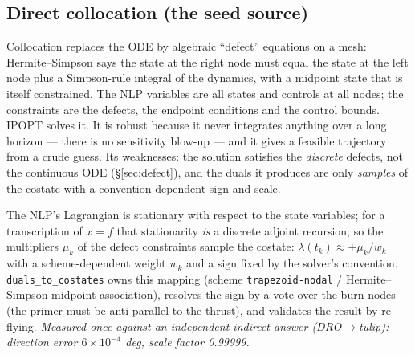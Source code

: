 \documentclass[11pt]{article}
\newcommand{\file}[1]{\texttt{#1}}
\begin{document}
\subsection{Direct collocation (the seed source)}
\begin{intu}
Collocation replaces the ODE by algebraic ``defect'' equations on a mesh:
Hermite--Simpson says the state at the right node must equal the state at the
left node plus a Simpson-rule integral of the dynamics, with a midpoint state
that is itself constrained. The NLP variables are all states and controls at
all nodes; the constraints are the defects, the endpoint conditions and the
control bounds. IPOPT solves it. It is robust because it never integrates
anything over a long horizon --- there is no sensitivity blow-up --- and it
gives a feasible trajectory from a crude guess. Its weaknesses: the solution
satisfies the \emph{discrete} defects, not the continuous ODE (\S\ref{sec:defect}),
and the duals it produces are only \emph{samples} of the costate with a
convention-dependent sign and scale.
\end{intu}
\begin{rig}
The NLP's Lagrangian is stationary with respect to the state variables; for a
transcription of $\dot x=f$ that stationarity \emph{is} a discrete adjoint
recursion, so the multipliers $\mu_k$ of the defect constraints sample the
costate: $\lambda(t_k)\approx \pm\mu_k/w_k$ with a scheme-dependent weight
$w_k$ and a sign fixed by the solver's convention. \file{duals\_to\_costates}
owns this mapping (scheme \texttt{trapezoid-nodal} / Hermite--Simpson
midpoint association), resolves the sign by a vote over the burn nodes
(the primer must be anti-parallel to the thrust), and validates the result
by re-flying. \emph{Measured once against an independent indirect answer
(DRO$\to$tulip): direction error $6\times10^{-4}$ deg, scale factor 0.99999.}
\end{rig}
\end{document}
